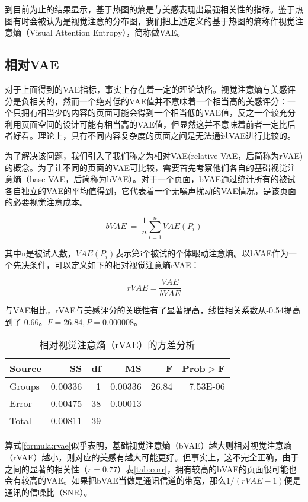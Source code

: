 \documentclass[master, fontset=mac, openany, oneside, zihao=-4]{sjtuthesis}
\begin{document}
到目前为止的结果显示，基于热图的熵是与美感表现出最强相关性的指标。鉴于热图有时会被认为是视觉注意的分布图，我们把上述定义的基于热图的熵称作视觉注意熵（Visual Attention Entropy），简称做VAE。

\subsection{相对VAE}
对于上面得到的VAE指标，事实上存在着一定的理论缺陷。视觉注意熵与美感评分是负相关的，然而一个绝对低的VAE值并不意味着一个相当高的美感评分：一个只拥有相当少的内容的页面可能会得到一个相当低的VAE值，反之一个较充分利用页面空间的设计可能有相当高的VAE值，但显然这并不意味着前者一定比后者好看。理论上，具有不同内容复杂度的页面之间是无法通过VAE进行比较的。

为了解决该问题，我们引入了我们称之为相对VAE(relative VAE，后简称为rVAE)的概念。为了让不同的页面的VAE可比较，需要首先考察他们各自的基础视觉注意熵（base VAE，后简称为bVAE）。对于一个页面，bVAE通过统计所有的被试各自独立的VAE的平均值得到，它代表着一个无噪声扰动的VAE情况，是该页面的必要视觉注意成本。

$$bVAE~=~\frac{1}{n}\sum_{i=1}^n VAE(P_i)$$

其中n是被试人数，$VAE(P_i)$表示第i个被试的个体眼动注意熵。以bVAE作为一个先决条件，可以定义如下的相对视觉注意熵rVAE：

\begin{equation}
rVAE = \frac{VAE}{bVAE}
\label{formula:rvae}
\end{equation}

与VAE相比，rVAE与美感评分的关联性有了显著提高，线性相关系数从-0.54提高到了-0.66。$F = 26.84, P = 0.000008$。

\begin{table}[H]
  \label{tab:ANOVA-rvae-dw}
  \centering
  \begin{tabular}{lrrrrr}
    \hline
    Source&SS&df&MS&F&Prob$>$F\\ \hline
    Groups&0.00336&1&0.00336&26.84&7.53E-06\\
    Error&0.00475&38&0.00013&&\\
    Total&0.00811&39&&&\\
    \hline
  \end{tabular}
  \caption{相对视觉注意熵（rVAE）的方差分析}
\end{table}

算式\ref{formula:rvae}似乎表明，基础视觉注意熵（bVAE）越大则相对视觉注意熵（rVAE）越小，则对应的美感有越大可能更好。但事实上，这不完全正确，由于之间的显著的相关性（$r = 0.77$）表\ref{tab:corr}，拥有较高的bVAE的页面很可能也会有较高的VAE。如果把bVAE当做是通讯信道的带宽，那么$1/(rVAE - 1)$便是通讯的信噪比（SNR）。
\end{document}
